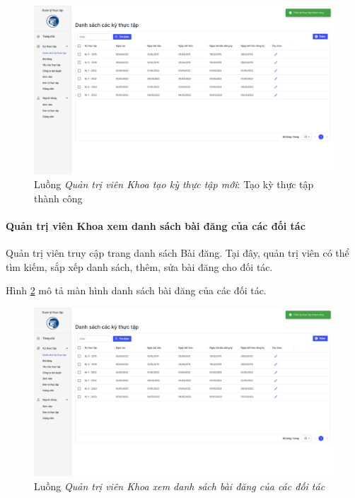 \documentclass[./../main.tex]{subfiles}
\begin{document}
\begin{figure}[]
	\includegraphics[width=\linewidth]{./images/image55.png}
	\caption{Luồng \emph{Quản trị viên Khoa tạo kỳ thực tập mới}: Tạo kỳ thực tập thành công}
	\label{fig:org_admin_add_term_success}
\end{figure}

\paragraph*{Quản trị viên Khoa xem danh sách bài đăng của các đối tác}

Quản trị viên truy cập trang danh sách Bài đăng. Tại đây, quản trị viên có thể tìm kiếm, sắp xếp danh sách, thêm, sửa bài đăng cho đối tác.

Hình \ref{fig:orgadmin_list_posts} mô tả màn hình danh sách bài đăng của các đối tác.

\begin{figure}[]
	\includegraphics[width=\linewidth]{./images/image55.png} %
	\caption{Luồng \emph{Quản trị viên Khoa xem danh sách bài đăng của các đối tác}}
	\label{fig:orgadmin_list_posts}
\end{figure}
\end{document}
